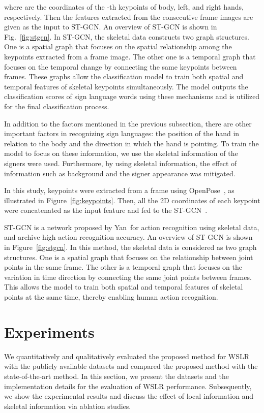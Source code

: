 \documentclass[journal]{IEEEtran}
\begin{document}
where  are the coordinates of the -th keypoints of body, left, and right hands, respectively. Then the features extracted from the consecutive frame images are given as the input to ST-GCN. An overview of ST-GCN is shown in Fig.~\ref{fig:stgcn}. In ST-GCN, the skeletal data constructs two graph structures. One is a spatial graph that focuses on the spatial relationship among the keypoints extracted from a frame image. The other one is a temporal graph that focuses on the temporal change by connecting the same keypoints between frames. These graphs allow the classification model to train both spatial and temporal features of skeletal keypoints simultaneously. The model outputs the classification scores of sign language words using these mechanisms and is utilized for the final classification process.

In addition to the factors mentioned in the previous subsection, there are other important factors in recognizing sign languages: the position of the hand in relation to the body and the direction in which the hand is pointing.
To train the model to focus on these information, we use the skeletal information of the signers were used.
Furthermore, by using skeletal information, the effect of information such as background and the signer appearance was mitigated.

In this study, keypoints were extracted from a frame using OpenPose~\cite{cao2017openpose}, as illustrated in Figure~\ref{fig:keypoints}.
Then, all the 2D coordinates of each keypoint were concatenated as the input feature and fed to the ST-GCN~\cite{yan2018stgcn}. 

ST-GCN is a network proposed by Yan~\etal for action recognition using skeletal data, and archive high action recognition accuracy.
An overview of ST-GCN is shown in Figure~\ref{fig:stgcn}.
In this method, the skeletal data is considered as two graph structures.
One is a spatial graph that focuses on the relationship between joint points in the same frame.
The other is a temporal graph that focuses on the variation in time direction by connecting the same joint points between frames.
This allows the model to train both spatial and temporal features of skeletal points at the same time, thereby enabling human action recognition.
\fi




\section{Experiments}\label{experiment}
We quantitatively and qualitatively evaluated the proposed method for WSLR with the publicly available datasets and compared the proposed method with the state-of-the-art method. In this section, we present the datasets and the implementation details for the evaluation of WSLR performance.  
Subsequently, we show the experimental results and discuss the effect of local information 
and skeletal information via ablation studies. 
\end{document}
